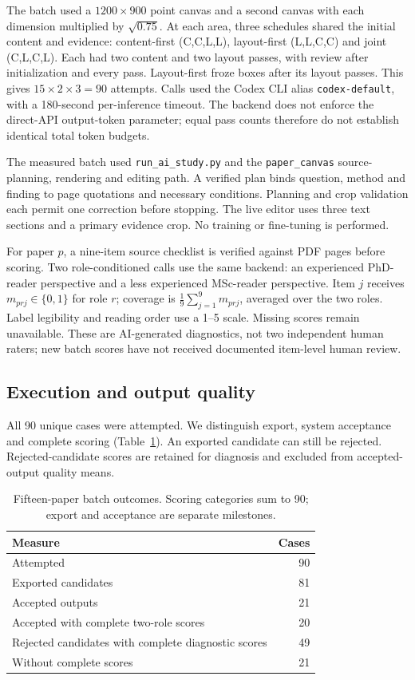 \documentclass{article}
\begin{document}
The batch used a $1200\times900$ point canvas and a second canvas with each dimension multiplied by $\sqrt{0.75}$. At each area, three schedules shared the initial content and evidence: content-first (C,C,L,L), layout-first (L,L,C,C) and joint (C,L,C,L). Each had two content and two layout passes, with review after initialization and every pass. Layout-first froze boxes after its layout passes. This gives $15\times2\times3=90$ attempts. Calls used the Codex CLI alias \texttt{codex-default}, with a 180-second per-inference timeout. The backend does not enforce the direct-API output-token parameter; equal pass counts therefore do not establish identical total token budgets.

The measured batch used \texttt{run\_ai\_study.py} and the \texttt{paper\_canvas} source-planning, rendering and editing path. A verified plan binds question, method and finding to page quotations and necessary conditions. Planning and crop validation each permit one correction before stopping. The live editor uses three text sections and a primary evidence crop. No training or fine-tuning is performed.

For paper $p$, a nine-item source checklist is verified against PDF pages before scoring. Two role-conditioned calls use the same backend: an experienced PhD-reader perspective and a less experienced MSc-reader perspective. Item $j$ receives $m_{prj}\in\{0,1\}$ for role $r$; coverage is $\frac{1}{9}\sum_{j=1}^{9}m_{prj}$, averaged over the two roles. Label legibility and reading order use a 1--5 scale. Missing scores remain unavailable. These are AI-generated diagnostics, not two independent human raters; new batch scores have not received documented item-level human review.

\subsection{Execution and output quality}
All 90 unique cases were attempted. We distinguish export, system acceptance and complete scoring (Table~\ref{tab:batch-outcomes}). An exported candidate can still be rejected. Rejected-candidate scores are retained for diagnosis and excluded from accepted-output quality means.

\begin{table}[ht]
\centering
\caption{Fifteen-paper batch outcomes. Scoring categories sum to 90; export and acceptance are separate milestones.}
\label{tab:batch-outcomes}
\begin{tabular}{lr}
\toprule
Measure & Cases \\
\midrule
Attempted & 90 \\
Exported candidates & 81 \\
Accepted outputs & 21 \\
Accepted with complete two-role scores & 20 \\
Rejected candidates with complete diagnostic scores & 49 \\
Without complete scores & 21 \\
\bottomrule
\end{tabular}
\end{table}
\end{document}
